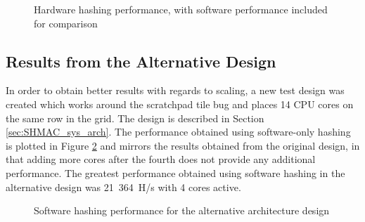 \begin{figure}
	\centering
	\caption{Hardware hashing performance, with software performance included for comparison}
	\label{fig:shadmacomp-scaling1}
\end{figure}

\subsection{Results from the Alternative Design}
In order to obtain better results with regards to scaling, a new test design was created which works
around the scratchpad tile bug and places 14 CPU cores on the same row in the grid. The design
is described in Section \ref{sec:SHMAC_sys_arch}. The performance obtained using software-only hashing
is plotted in Figure \ref{fig:sw-scaling2} and mirrors the results obtained from the original design,
in that adding more cores after the fourth does not provide any additional performance. The greatest
performance obtained using software hashing in the alternative design was 21~364~H/s with 4 cores
active.

\begin{figure}
	\centering
	\caption{Software hashing performance for the alternative architecture design}
	\label{fig:sw-scaling2}
\end{figure}

